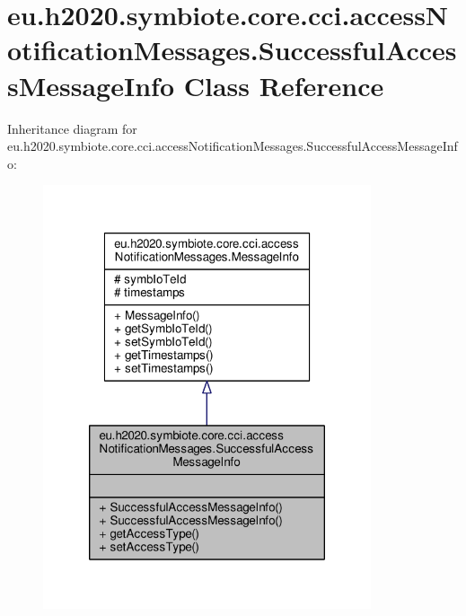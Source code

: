 \hypertarget{classeu_1_1h2020_1_1symbiote_1_1core_1_1cci_1_1accessNotificationMessages_1_1SuccessfulAccessMessageInfo}{}\section{eu.\+h2020.\+symbiote.\+core.\+cci.\+access\+Notification\+Messages.\+Successful\+Access\+Message\+Info Class Reference}
\label{classeu_1_1h2020_1_1symbiote_1_1core_1_1cci_1_1accessNotificationMessages_1_1SuccessfulAccessMessageInfo}


Inheritance diagram for eu.\+h2020.\+symbiote.\+core.\+cci.\+access\+Notification\+Messages.\+Successful\+Access\+Message\+Info\+:
\nopagebreak
\begin{figure}[H]
\begin{center}
\leavevmode
\includegraphics[width=274pt]{classeu_1_1h2020_1_1symbiote_1_1core_1_1cci_1_1accessNotificationMessages_1_1SuccessfulAccessMessageInfo__inherit__graph}
\end{center}
\end{figure}


